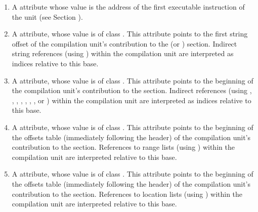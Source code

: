 \begin{enumerate}[1. ]
\item 
\hypertarget{chap:DWATentrypcofcompileunit}{}
\hypertarget{chap:DWATentrypcofpartialunit}{}
A \DWATentrypc{} attribute whose value is the address of the first
executable instruction of the unit (see 
Section ).

\item \hypertarget{chap:DWATstroffsetbaseforindirectstringtable}{}
A \DWATstroffsetsbaseDEFN{}
attribute, whose value is of class \CLASSstroffsetsptr. 
This attribute points to the first string
offset of the compilation unit's contribution to the
\dotdebugstroffsets{} (or \dotdebugstroffsetsdwo{}) section. 
Indirect string references
(using \DWFORMstrxXNor) within the compilation unit are
interpreted as indices relative to this base.

\item \hypertarget{chap:DWATaddrbaseforaddresstable}{}
A \DWATaddrbaseDEFN{}
attribute, whose value is of class \CLASSaddrptr.
This attribute points to the beginning of the compilation
unit's contribution to the \dotdebugaddr{} section.
Indirect references (using \DWFORMaddrxXN, \DWOPaddrx, 
\DWOPconstx, 
\DWLLEbaseaddressx{}, \DWLLEstartxendx{}, \DWLLEstartxlength{},
\DWRLEbaseaddressx{}, \DWRLEstartxendx{} or \DWRLEstartxlength) 
within the compilation unit are interpreted as indices 
relative to this base.

\item \hypertarget{chap:DWATrnglistsbaseforrnglists}{}
A \DWATrnglistsbaseDEFN{}
attribute, whose value is of class \CLASSrnglistsptr.
This attribute points to the beginning of the offsets table 
(immediately following the header) of the compilation
unit's contribution to the \dotdebugrnglists{} section.
References to range lists (using \DWFORMrnglistx)
within the compilation unit are
interpreted relative to this base.

\item \hypertarget{chap:DWATloclistsbaseinlocationlist}{}
A \DWATloclistsbaseDEFN{} 
attribute, whose value is of class \CLASSloclistsptr. 
This attribute points to the beginning of the offsets table 
(immediately following the header) of the compilation 
unit's contribution to the \dotdebugloclists{} section. References 
to location lists (using \DWFORMloclistx) within the compilation 
unit are interpreted relative to this base.
\end{enumerate}


